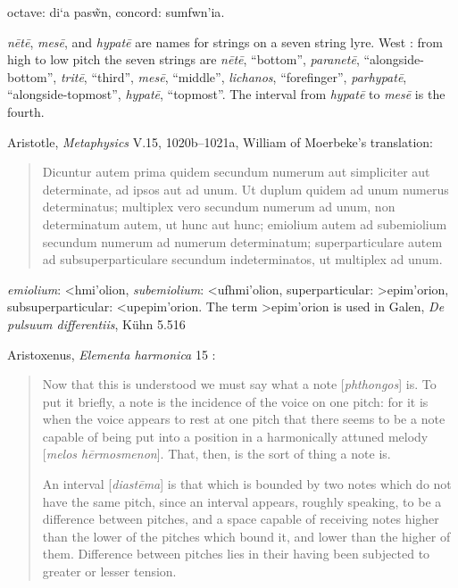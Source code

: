 \documentclass{amsart}
\newcommand{\textgreek}[1]{\begingroup\fontencoding{LGR}\selectfont#1\endgroup}
\theoremstyle{definition}
\begin{document}
octave: \textgreek{di`a pas\~wn},
concord: \textgreek{sumfwn'ia}.

{\em n\={e}t\={e}}, {\em mes\={e}}, and {\em hypat\={e}} are names for strings on a seven string lyre.
West \cite[p.~219]{west}: from high to low pitch the seven strings are
{\em n\={e}t\={e}}, ``bottom'',
{\em paranet\={e}}, ``alongside-bottom'',
{\em trit\={e}}, ``third'',
{\em mes\={e}}, ``middle'',
{\em lichanos}, ``forefinger'',
{\em parhypat\={e}}, ``alongside-topmost'',
{\em hypat\={e}}, ``topmost''.
The interval from {\em hypat\={e}} to {\em mes\={e}} is the fourth.

Aristotle, {\em Metaphysics} V.15, 1020b--1021a, William of Moerbeke's translation:

\begin{quote}
Dicuntur autem prima quidem secundum numerum aut simpliciter aut determinate, ad ipsos aut ad unum. Ut duplum quidem ad unum numerus determinatus; multiplex vero secundum numerum ad unum, non determinatum autem, ut hunc aut hunc; emiolium autem ad subemiolium secundum numerum ad numerum determinatum; superparticulare autem ad subsuperparticulare secundum indeterminatos, ut multiplex ad unum.
\end{quote}

{\em emiolium}: \textgreek{<hmi'olion},
{\em subemiolium}: \textgreek{<ufhmi'olion},
superparticular: \textgreek{>epim'orion},
subsuperparticular: \textgreek{<upepim'orion}.
The term \textgreek{>epim'orion} is used in Galen, {\em De pulsuum differentiis}, K\"uhn 5.516 \cite{galeni}

Aristoxenus, {\em Elementa harmonica} 15 \cite[p.~136]{barker}:

\begin{quote}
Now that this is understood we must say what a note [{\em phthongos}] is. To
put it briefly, a note is the incidence of the voice on one pitch: for it is when
the voice appears to rest at one pitch that there seems to be a note capable
of being put into a position in a harmonically attuned melody [{\em melos
h\={e}rmosmenon}]. That, then, is the sort of thing a note is.

An interval [{\em diast\={e}ma}] is that which is bounded by two notes which do not
have the same pitch, since an interval appears, roughly speaking, to be a
difference between pitches, and a space capable of receiving notes higher than
the lower of the pitches which bound it, and lower than the higher of them.
Difference between pitches lies in their having been subjected to greater or
lesser tension.
\end{quote}
\end{document}
